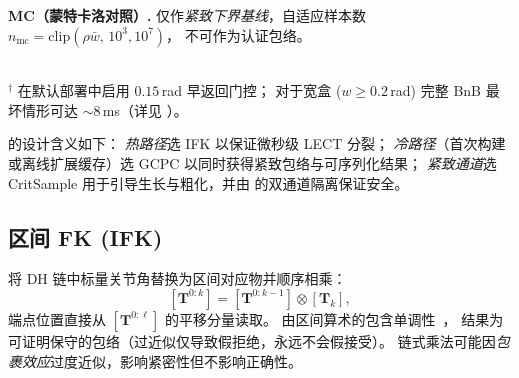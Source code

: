 \documentclass[journal]{IEEEtran}
\newcommand{\bT}{\mathbf{T}}
\begin{document}
\textbf{MC（蒙特卡洛对照）.}
仅作\emph{紧致下界基线}，自适应样本数
$n_\text{mc}=\mathrm{clip}(\rho\bar w,\,10^3,10^7)$，
不可作为认证包络。

\begin{table}[ht]
\centering
\caption{epiAABB 计算管线特性对比（$D=7$，$L_\text{act}=4$）}
\label{tab:epi_compare}
\\[2pt]
{\scriptsize $^{\dagger}$ 在默认部署中启用 $0.15$\,rad 早返回门控；
对于宽盒 ($w\!\geq\!0.2$\,rad) 完整 BnB 最坏情形可达 ${\sim}8$\,ms（详见 ）。}
\end{table}

 的设计含义如下：
\emph{热路径}选 IFK 以保证微秒级 LECT 分裂；
\emph{冷路径}（首次构建或离线扩展缓存）选 GCPC 以同时获得紧致包络与可序列化结果；
\emph{紧致通道}选 CritSample 用于引导生长与粗化，并由
 的双通道隔离保证安全。

\subsection{区间 FK (IFK)}\label{sec:ifk}

将 DH 链中标量关节角替换为区间对应物并顺序相乘：
\begin{equation}\label{eq:chain}
  [\bT^{0:k}] = [\bT^{0:k-1}] \otimes [\bT_k],
\end{equation}
端点位置直接从 $[\bT^{0:\ell}]$ 的平移分量读取。
由区间算术的包含单调性~\cite{moore2009introduction}，
结果为可证明保守的包络（过近似仅导致假拒绝，永远不会假接受）。
链式乘法可能因\emph{包裹效应}过度近似，影响紧密性但不影响正确性。
\end{document}
